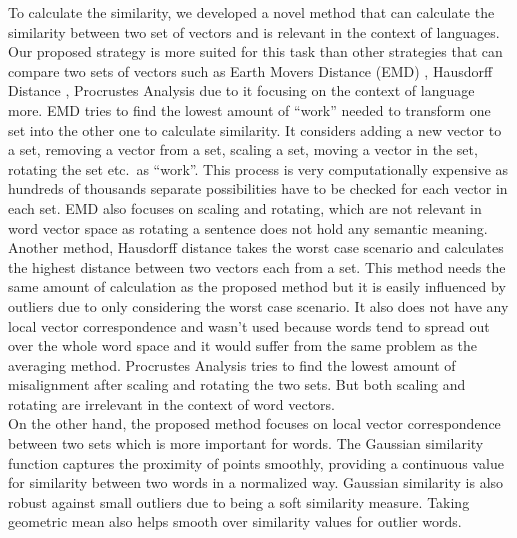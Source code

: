 To calculate the similarity, we developed a novel method that can calculate the similarity between two set of vectors and is relevant in the context of languages. Our proposed strategy is more suited for this task than other strategies that can compare two sets of vectors such as Earth Movers Distance (EMD) \cite{Rubner-19998-emd}, Hausdorff Distance \cite{hausdorff-1914-hausdorff-distance}, Procrustes Analysis \cite{Gower-1975-procrustes-distance} due to it focusing on the context of language more. EMD \cite{Rubner-19998-emd} tries to find the lowest amount of ``work'' needed to transform one set into the other one to calculate similarity. It considers adding a new vector to a set, removing a vector from a set, scaling a set, moving a vector in the set, rotating the set etc.\ as ``work''. This process is very computationally expensive as hundreds of thousands separate possibilities have to be checked for each vector in each set. EMD also focuses on scaling and rotating, which are not relevant in word vector space as rotating a sentence does not hold any semantic meaning. Another method, Hausdorff distance \cite{hausdorff-1914-hausdorff-distance} takes the worst case scenario and calculates the highest distance between two vectors each from a set. This method needs the same amount of calculation as the proposed method but it is easily influenced by outliers due to only considering the worst case scenario. It also does not have any local vector correspondence and wasn't used because words tend to spread out over the whole word space and it would suffer from the same problem as the averaging method. Procrustes Analysis \cite{Gower-1975-procrustes-distance} tries to find the lowest amount of misalignment after scaling and rotating the two sets. But both scaling and rotating are irrelevant in the context of word vectors.\\

On the other hand, the proposed method focuses on local vector correspondence between two sets which is more important for words. The Gaussian similarity function captures the proximity of points smoothly, providing a continuous value for similarity between two words in a normalized way. Gaussian similarity is also robust against small outliers due to being a soft similarity measure. Taking geometric mean also helps smooth over similarity values for outlier words.\\

